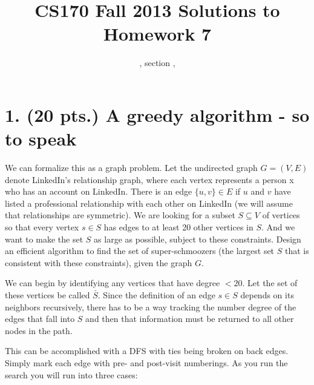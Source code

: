 \documentclass[11pt]{article}
\title{CS170  Fall 2013 Solutions to Homework 7}
\author{\Name, section \Sec, \texttt{\Login}}
\begin{document}
\maketitle

\section*{1. (20 pts.) A greedy algorithm - so to speak}

We can formalize this as a graph problem. Let the undirected graph
 $G = (V,E)$ denote LinkedIn's relationship graph, where each vertex represents a person x
who has an account on LinkedIn. 
There is an edge $\{u, v\} \in E$ if $u$ and $v$ have listed a professional 
relationship with each other on LinkedIn (we will assume that relationships are symmetric). 
We are looking for a subset $S \subseteq V$ of vertices so that every vertex $s \in S$
 has edges to at least 20 other vertices in $S$. 
And we want to make the set $S$ as large as possible, subject to these constraints.
Design an efficient algorithm to find the set of super-schmoozers (the largest set $S$
 that is consistent with these constraints), given the graph $G$.

We can begin by identifying any vertices that have degree $< 20$.  Let the set of these
vertices be called $\bar{S}$.
Since the definition of an edge $s\in S$ depends on its neighbors recursively, 
there has to be a way tracking the number degree of the edges that fall into $S$ and then
that information must be returned to all other nodes in the path. 

This can be accomplished with a DFS with ties being broken on back edges. Simply mark each 
edge with pre- and post-visit numberings. As you run the search you will run into three cases:
\end{document}
